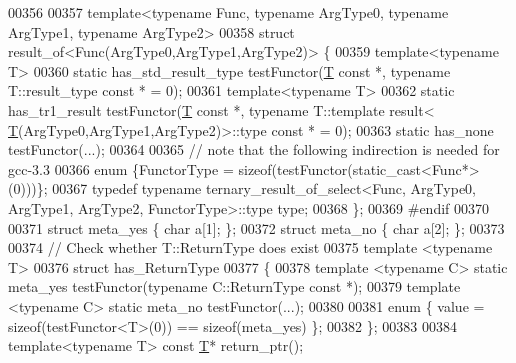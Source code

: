 \begin{DoxyCode}
00356 
00357 \textcolor{keyword}{template}<\textcolor{keyword}{typename} Func, \textcolor{keyword}{typename} ArgType0, \textcolor{keyword}{typename} ArgType1, \textcolor{keyword}{typename} ArgType2>
00358 \textcolor{keyword}{struct }result\_of<Func(ArgType0,ArgType1,ArgType2)> \{
00359     \textcolor{keyword}{template}<\textcolor{keyword}{typename} T>
00360     \textcolor{keyword}{static} has\_std\_result\_type    testFunctor(\hyperlink{group___sparse_core___module_class_eigen_1_1_triplet}{T} \textcolor{keyword}{const} *, \textcolor{keyword}{typename} T::result\_type \textcolor{keyword}{const} * = 0);
00361     \textcolor{keyword}{template}<\textcolor{keyword}{typename} T>
00362     \textcolor{keyword}{static} has\_tr1\_result         testFunctor(\hyperlink{group___sparse_core___module_class_eigen_1_1_triplet}{T} \textcolor{keyword}{const} *, \textcolor{keyword}{typename} T::template result<
      \hyperlink{group___sparse_core___module_class_eigen_1_1_triplet}{T}(ArgType0,ArgType1,ArgType2)>::type \textcolor{keyword}{const} * = 0);
00363     \textcolor{keyword}{static} has\_none               testFunctor(...);
00364 
00365     \textcolor{comment}{// note that the following indirection is needed for gcc-3.3}
00366     \textcolor{keyword}{enum} \{FunctorType = \textcolor{keyword}{sizeof}(testFunctor(static\_cast<Func*>(0)))\};
00367     \textcolor{keyword}{typedef} \textcolor{keyword}{typename} ternary\_result\_of\_select<Func, ArgType0, ArgType1, ArgType2, FunctorType>::type type;
00368 \};
00369 \textcolor{preprocessor}{#endif}
00370 
00371 \textcolor{keyword}{struct }meta\_yes \{ \textcolor{keywordtype}{char} a[1]; \};
00372 \textcolor{keyword}{struct }meta\_no  \{ \textcolor{keywordtype}{char} a[2]; \};
00373 
00374 \textcolor{comment}{// Check whether T::ReturnType does exist}
00375 \textcolor{keyword}{template} <\textcolor{keyword}{typename} T>
00376 \textcolor{keyword}{struct }has\_ReturnType
00377 \{
00378   \textcolor{keyword}{template} <\textcolor{keyword}{typename} C> \textcolor{keyword}{static} meta\_yes testFunctor(\textcolor{keyword}{typename} C::ReturnType \textcolor{keyword}{const} *);
00379   \textcolor{keyword}{template} <\textcolor{keyword}{typename} C> \textcolor{keyword}{static} meta\_no testFunctor(...);
00380 
00381   \textcolor{keyword}{enum} \{ value = \textcolor{keyword}{sizeof}(testFunctor<T>(0)) == \textcolor{keyword}{sizeof}(meta\_yes) \};
00382 \};
00383 
00384 \textcolor{keyword}{template}<\textcolor{keyword}{typename} T> \textcolor{keyword}{const} \hyperlink{group___sparse_core___module_class_eigen_1_1_triplet}{T}* return\_ptr();

\end{DoxyCode}

